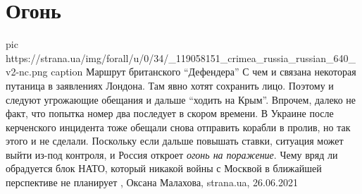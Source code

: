  
 
 
 
 
\chapter{Огонь}
\label{sec:slova.ogonj}

\ifcmt
  pic https://strana.ua/img/forall/u/0/34/_119058151_crimea_russia_russian_640_v2-nc.png
  caption Маршрут британского \enquote{Дефендера}
\fi
С чем и связана некоторая путаница в заявлениях Лондона. Там явно хотят
сохранить лицо. Поэтому и следуют угрожающие обещания и дальше \enquote{ходить
на Крым}.  Впрочем, далеко не факт, что попытка номер два последует в скором
времени.  В Украине после керченского инцидента тоже обещали снова отправить
корабли в пролив, но так этого и не сделали. Поскольку если дальше повышать
ставки, ситуация может выйти из-под контроля, и Россия откроет \emph{огонь на
поражение}. Чему вряд ли обрадуется блок НАТО, который никакой войны с Москвой
в ближайшей перспективе не планирует
, 
Оксана Малахова, strana.ua, 26.06.2021

